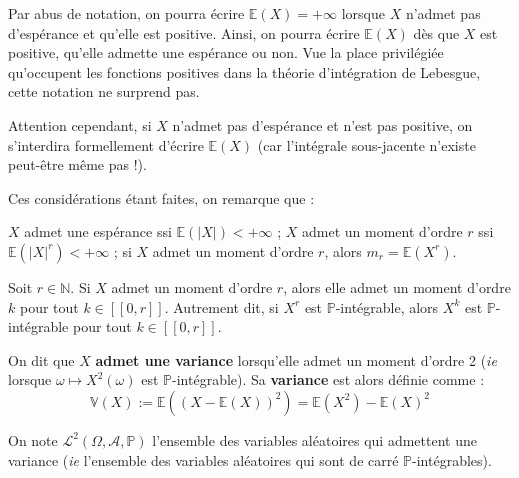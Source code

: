 \documentclass[../integ-proba.tex]{subfiles}
\begin{document}
\begin{rem}
    Par abus de notation, on pourra écrire $\mathbb{E}(X)=+\infty$ lorsque $X$ n'admet pas d'espérance et qu'elle est positive.
    Ainsi, on pourra écrire $\mathbb{E}(X)$ dès que $X$ est positive, qu'elle admette une espérance ou non.
    Vue la place privilégiée qu'occupent les fonctions positives dans la théorie d'intégration de Lebesgue, cette notation ne surprend pas.
    
    Attention cependant, si $X$ n'admet pas d'espérance et n'est pas positive, on s'interdira formellement d'écrire $\mathbb{E}(X)$ (car l'intégrale sous-jacente n'existe peut-être même pas !).
\end{rem}

\begin{rem}
    Ces considérations étant faites, on remarque que :
    \begin{itemize}
        \itemb $X$ admet une espérance ssi $\mathbb{E}(\left| X \right|) < +\infty$ ;
        \itemb $X$ admet un moment d'ordre $r$ ssi $\mathbb{E}(\left| X \right|^r) < +\infty$ ;
        \itemb si $X$ admet un moment d'ordre $r$, alors $m_r = \mathbb{E}(X^r)$.
    \end{itemize}
\end{rem}

\begin{prop}
    \label{prop:moments_cascade}
    Soit $r\in\mathbb{N}$. Si $X$ admet un moment d'ordre $r$, alors elle admet un moment d'ordre $k$ pour tout $k\in[\![0,r]\!]$.
    Autrement dit, si $X^r$ est $\mathbb{P}$-intégrable, alors $X^k$ est $\mathbb{P}$-intégrable pour tout $k\in[\![0,r]\!]$.
\end{prop}

\begin{defi}
    On dit que $X$ \textbf{admet une variance} lorsqu'elle admet un moment d'ordre 2 (\textit{ie} lorsque $\omega \mapsto X^2\left(\omega\right)$ est $\mathbb{P}$-intégrable).
    Sa \textbf{variance} est alors définie comme :
    $$
    \mathbb{V}(X):=\mathbb{E}\left(\left(X - \mathbb{E}\left(X\right)\right)^2\right)=\mathbb{E}\left(X^2\right) - \mathbb{E}\left(X\right)^2
    $$
    
    On note $\mathcal{L}^2\left(\Omega, \mathcal{A}, \mathbb{P}\right)$ l'ensemble des variables aléatoires qui admettent une variance (\textit{ie} l'ensemble des variables aléatoires qui sont de carré $\mathbb{P}$-intégrables).
\end{defi}
\end{document}
